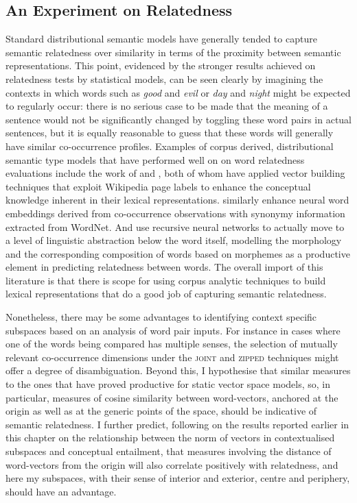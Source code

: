 \subsection{An Experiment on Relatedness}
Standard distributional semantic models have generally tended to capture semantic relatedness over similarity in terms of the proximity between semantic representations.  This point, evidenced by the stronger results achieved on relatedness tests by statistical models, can be seen clearly by imagining the contexts in which words such as \emph{good} and \emph{evil} or \emph{day} and \emph{night} might be expected to regularly occur: there is no serious case to be made that the meaning of a sentence would not be significantly changed by toggling these word pairs in actual sentences, but it is equally reasonable to guess that these words will generally have similar co-occurrence profiles.  Examples of corpus derived, distributional semantic type models that have performed well on on word relatedness evaluations include the work of \cite{GarbilovichEA2007} and \cite{HassanEA2011}, both of whom have applied vector building techniques that exploit Wikipedia page labels to enhance the conceptual knowledge inherent in their lexical representations.  \cite{HalawiEA2012} similarly enhance neural word embeddings derived from co-occurrence observations with synonymy information extracted from WordNet.  And \cite{LuongEA2013} use recursive neural networks to actually move to a level of linguistic abstraction below the word itself, modelling the morphology and the corresponding composition of words based on morphemes as a productive element in predicting relatedness between words.  The overall import of this literature is that there is scope for using corpus analytic techniques to build lexical representations that do a good job of capturing semantic relatedness.

Nonetheless, there may be some advantages to identifying context specific subspaces based on an analysis of word pair inputs.  For instance in cases where one of the words being compared has multiple senses, the selection of mutually relevant co-occurrence dimensions under the \textsc{joint} and \textsc{zipped} techniques might offer a degree of disambiguation.  Beyond this, I hypothesise that similar measures to the ones that have proved productive for static vector space models, so, in particular, measures of cosine similarity between word-vectors, anchored at the origin as well as at the generic points of the space, should be indicative of semantic relatedness.  I further predict, following on the results reported earlier in this chapter on the relationship between the norm of vectors in contextualised subspaces and conceptual entailment, that measures involving the distance of word-vectors from the origin will also correlate positively with relatedness, and here my subspaces, with their sense of interior and exterior, centre and periphery, should have an advantage.

